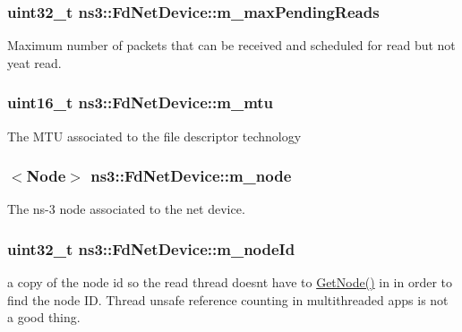 \subsubsection[{\texorpdfstring{m\+\_\+max\+Pending\+Reads}{m_maxPendingReads}}]{\setlength{\rightskip}{0pt plus 5cm}uint32\+\_\+t ns3\+::\+Fd\+Net\+Device\+::m\+\_\+max\+Pending\+Reads\hspace{0.3cm}{\ttfamily [private]}}\hypertarget{classns3_1_1FdNetDevice_a4be8b630492f263f0cb5f9c5fd223eac}{}\label{classns3_1_1FdNetDevice_a4be8b630492f263f0cb5f9c5fd223eac}
Maximum number of packets that can be received and scheduled for read but not yeat read. 
\subsubsection[{\texorpdfstring{m\+\_\+mtu}{m_mtu}}]{\setlength{\rightskip}{0pt plus 5cm}uint16\+\_\+t ns3\+::\+Fd\+Net\+Device\+::m\+\_\+mtu\hspace{0.3cm}{\ttfamily [private]}}\hypertarget{classns3_1_1FdNetDevice_a26eb80ddedbacaf1f5a1c19940e7225d}{}\label{classns3_1_1FdNetDevice_a26eb80ddedbacaf1f5a1c19940e7225d}
The M\+TU associated to the file descriptor technology 
\subsubsection[{\texorpdfstring{m\+\_\+node}{m_node}}]{$<${\bf Node}$>$ ns3\+::\+Fd\+Net\+Device\+::m\+\_\+node\hspace{0.3cm}{\ttfamily [private]}}\hypertarget{classns3_1_1FdNetDevice_a344e2f5a2628c1a0305d5b4bbf72f8c6}{}\label{classns3_1_1FdNetDevice_a344e2f5a2628c1a0305d5b4bbf72f8c6}
The ns-\/3 node associated to the net device. 
\subsubsection[{\texorpdfstring{m\+\_\+node\+Id}{m_nodeId}}]{\setlength{\rightskip}{0pt plus 5cm}uint32\+\_\+t ns3\+::\+Fd\+Net\+Device\+::m\+\_\+node\+Id\hspace{0.3cm}{\ttfamily [private]}}\hypertarget{classns3_1_1FdNetDevice_aed43dab9b55bd308388c3a9f1510a709}{}\label{classns3_1_1FdNetDevice_aed43dab9b55bd308388c3a9f1510a709}
a copy of the node id so the read thread doesn\textquotesingle{}t have to \hyperlink{classns3_1_1FdNetDevice_a301f937cb45179136ad4b2fe4750a56f}{Get\+Node()} in in order to find the node ID. Thread unsafe reference counting in multithreaded apps is not a good thing. 
